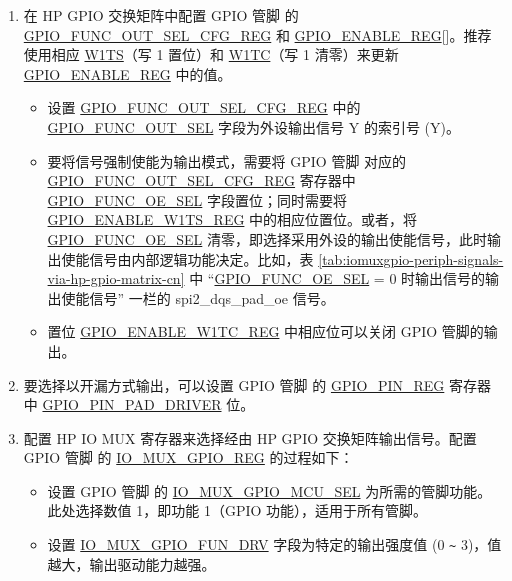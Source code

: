 \documentclass[main\_\_CN.tex]{subfiles}
\begin{document}
\begin{enumerate}
    \item 在 HP GPIO 交换矩阵中配置 GPIO 管脚  的 \hyperref[regdesc:GPIOFUNCNOUTSELCFGREG]{GPIO\_FUNC\_OUT\_SEL\_CFG\_REG} 和  \hyperref[regdesc:GPIOENABLEREG]{GPIO\_ENABLE\_REG}[]。推荐使用相应 \hyperref[regdesc:GPIOENABLEW1TSREG]{W1TS}（写 1 置位）和 \hyperref[regdesc:GPIOENABLEW1TCREG]{W1TC}（写 1 清零）来更新 \hyperref[regdesc:GPIOENABLEREG]{GPIO\_ENABLE\_REG} 中的值。


    \begin{itemize}
        \item 设置 \hyperref[regdesc:GPIOFUNCNOUTSELCFGREG]{GPIO\_FUNC\_OUT\_SEL\_CFG\_REG} 中的 \hyperref[fielddesc:GPIOFUNCNOUTSEL]{GPIO\_FUNC\_OUT\_SEL} 字段为外设输出信号 Y 的索引号 (Y)。
        \item 要将信号强制使能为输出模式，需要将 GPIO 管脚  对应的 \hyperref[regdesc:GPIOFUNCNOUTSELCFGREG]{GPIO\_FUNC\_OUT\_SEL\_CFG\_REG} 寄存器中 \hyperref[fielddesc:GPIOFUNCNOESEL]{GPIO\_FUNC\_OE\_SEL} 字段置位；同时需要将 \hyperref[regdesc:GPIOENABLEW1TSREG]{GPIO\_ENABLE\_W1TS\_REG} 中的相应位置位。或者，将 \hyperref[fielddesc:GPIOFUNCNOESEL]{GPIO\_FUNC\_OE\_SEL} 清零，即选择采用外设的输出使能信号，此时输出使能信号由内部逻辑功能决定。比如，表 \ref{tab:iomuxgpio-periph-signals-via-hp-gpio-matrix-cn} 中 “\hyperref[fielddesc:GPIOFUNCNOESEL]{GPIO\_FUNC\_OE\_SEL} = 0 时输出信号的输出使能信号” 一栏的 spi2\_dqs\_pad\_oe 信号。
       \item 置位 \hyperref[regdesc:GPIOENABLEW1TCREG]{GPIO\_ENABLE\_W1TC\_REG} 中相应位可以关闭 GPIO 管脚的输出。
    \end{itemize}
    \item 要选择以开漏方式输出，可以设置 GPIO 管脚  的 \hyperref[regdesc:GPIOPINNREG]{GPIO\_PIN\_REG} 寄存器中 \hyperref[fielddesc:GPIOPINNPADDRIVER]{GPIO\_PIN\_PAD\_DRIVER} 位。
    \item 配置 HP IO MUX 寄存器来选择经由 HP GPIO 交换矩阵输出信号。配置 GPIO 管脚  的 \hyperref[regdesc:IOMUXGPIONREG]{IO\_MUX\_GPIO\_REG} 的过程如下：
    \begin{itemize}
        \item 设置 GPIO 管脚  的  \hyperref[fielddesc:IOMUXGPIONMCUSEL]{IO\_MUX\_GPIO\_MCU\_SEL} 为所需的管脚功能。此处选择数值 1，即功能 1（GPIO 功能），适用于所有管脚。
        \item 设置 \hyperref[fielddesc:IOMUXGPIONFUNDRV]{IO\_MUX\_GPIO\_FUN\_DRV} 字段为特定的输出强度值 (0 \verb+~+ 3)，值越大，输出驱动能力越强。

\end{itemize}
\end{enumerate}
\end{document}

